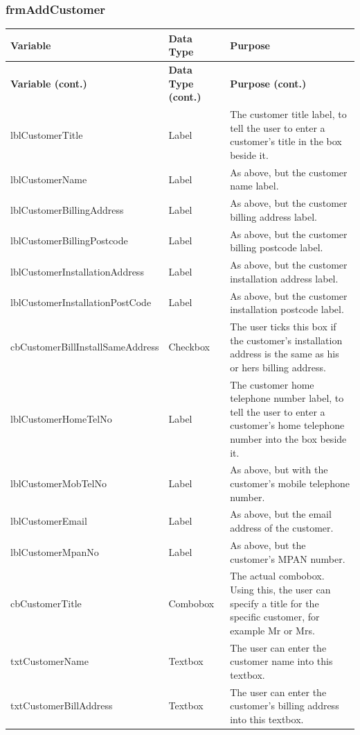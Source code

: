 	\subsubsection{frmAddCustomer}	
	\begin{longtable}{ | p{4cm} | p{3cm} | p{10cm} |}
		\hline
		\textbf{Variable} & \textbf{Data Type} & \textbf{Purpose}\\
		\endfirsthead
		\hline
		\textbf{Variable (cont.)} & \textbf{Data Type (cont.)} & \textbf{Purpose (cont.)}\\
		\endhead
		\hline
		lblCustomerTitle & Label & The customer title label, to tell the user to enter a customer's title in the box beside it.\\
		\hline
		lblCustomerName & Label & As above, but the customer name label.\\
		\hline
		lblCustomerBillingAddress & Label & As above, but the customer billing address label.\\
		\hline
		lblCustomerBillingPostcode & Label & As above, but the customer billing postcode label.\\
		\hline
		lblCustomerInstallationAddress & Label & As above, but the customer installation address label.\\
		\hline
		lblCustomerInstallationPostCode & Label & As above, but the customer installation postcode label.\\
		\hline
		cbCustomerBillInstallSameAddress & Checkbox & The user ticks this box if the customer's installation address is the same as his or hers billing address.\\
		\hline
		lblCustomerHomeTelNo & Label & The customer home telephone number label, to tell the user to enter a customer's home telephone number into the box beside it.\\
		\hline
		lblCustomerMobTelNo & Label & As above, but with the customer's mobile telephone number.\\
		\hline
		lblCustomerEmail & Label & As above, but the email address of the customer.\\
		\hline
		lblCustomerMpanNo & Label & As above, but the customer's MPAN number.\\
		\hline
		cbCustomerTitle & Combobox & The actual combobox.  Using this, the user can specify a title for the specific customer, for example Mr or Mrs.\\
		\hline
		txtCustomerName & Textbox & The user can enter the customer name into this textbox.\\
		\hline
		txtCustomerBillAddress & Textbox & The user can enter the customer's billing address into this textbox.\\

\end{longtable}
